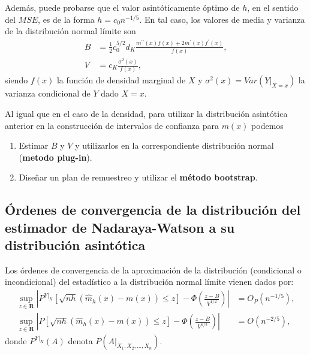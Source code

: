 \documentclass[]{book}
\theoremstyle{definition}
\theoremstyle{definition}
\theoremstyle{definition}
\theoremstyle{remark}
\begin{document}
Además, puede probarse que el valor asintóticamente óptimo de \(h\), en
el sentido del \(MSE\), es de la forma \(h=c_{0}n^{-1/5}\). En tal caso,
los valores de media y varianza de la distribución normal límite son
\[\begin{aligned}
B &= \frac{1}{2}c_{0}^{5/2}d_{K}\frac{m^{\prime \prime }\left( x \right)
f\left( x \right) +2m^{\prime}\left( x \right) f^{\prime}\left( x \right)}{
f\left( x \right)}, \\
V &= c_{K}\frac{\sigma^2\left( x \right)}{f\left( x \right)},
\end{aligned}\] siendo \(f\left( x \right)\) la función de densidad
marginal de \(X\) y
\(\sigma^2\left( x \right) =Var\left( \left. Y\right\vert _{X=x} \right)\)
la varianza condicional de \(Y\) dado \(X=x\).

Al igual que en el caso de la densidad, para utilizar la distribución
asintótica anterior en la construcción de intervalos de confianza para
\(m\left( x \right)\) podemos

\begin{enumerate}
\def\labelenumi{\arabic{enumi}.}
\item
  Estimar \(B\) y \(V\) y utilizarlos en la correspondiente distribución
  normal (\textbf{metodo plug-in}).
\item
  Diseñar un plan de remuestreo y utilizar el \textbf{método bootstrap}.
\end{enumerate}

\subsection{Órdenes de convergencia de la distribución del estimador de
Nadaraya-Watson a su distribución
asintótica}\label{ordenes-de-convergencia-de-la-distribucion-del-estimador-de-nadaraya-watson-a-su-distribucion-asintotica}

Los órdenes de convergencia de la aproximación de la distribución
(condicional o incondicional) del estadístico a la distribución normal
límite vienen dados por: \[\begin{aligned}
\sup_{z\in \boldsymbol{R}}\left\vert P^{\left. Y\right\vert _{X}}\left[ 
\sqrt{nh}\left( \hat{m}_{h}\left( x \right) -m\left( x \right) \right) \leq z
\right] -\Phi \left( \frac{z-B}{V^{1/2}} \right) \right\vert &= O_{P}\left(
n^{-1/5} \right), \\
\sup_{z\in \boldsymbol{R}}\left\vert P\left[ \sqrt{nh}\left( \hat{m}
_{h}\left( x \right) -m\left( x \right) \right) \leq z\right] -\Phi \left( 
\frac{z-B}{V^{1/2}} \right) \right\vert &= O\left( n^{-2/5} \right),
\end{aligned}\] donde \(P^{\left. Y\right\vert_{X}}\left( A \right)\)
denota \(P\left( \left. A \right\vert_{X_1,X_2,\ldots ,X_n} \right)\).
\end{document}
